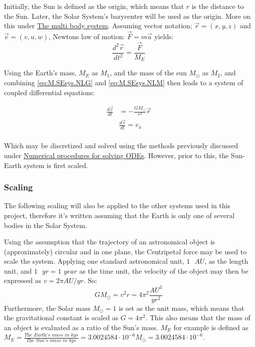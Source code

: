 \documentclass[%
oneside,                 %
final,                   %
10pt]{article}
\begin{document}
Initially, the Sun is defined as the origin, which means that $r$ is the distance to the Sun. Later, the Solar System's barycenter will be used as the origin. More on this under \hyperref[sec:Modmultibody]{The multi body system}. Assuming vector notation; $\vec{r}=(x,y,z)$ and $\vec{v}=(v,u,w)$,  Newtons law of motion: $\vec{F}=m\vec{a}$ yields: \newline
\begin{equation}
\frac{d^2 \vec{r}}{dt^2}=\frac{\vec{F}}{M_E}
\label{eq:M.SEsys.NLM}
\end{equation}

Using the Earth's mass, $M_E$ as $M_1$, and the mass of the sun $M_{\odot}$ as $M_2$, and combining \eqref{eq:M.SEsys.NLG} and \eqref{eq:M.SEsys.NLM} then leads to a system of coupled differential equations:


\begin{align}
\frac{d\vec{v} }{dt}&=-\frac{GM_{\odot}}{r^3} \vec{r} \label{eq:M.SEsys.dv/dt} \\
&\frac{d\vec{r}}{dt}=v_x \label{eq:M.SEsys.dr/dt}\\
\end{align}

Which may be discretized and solved using the methods previously discussed under \hyperref[sec:NPs]{Numerical procedures for solving ODEs}. However, prior to this, the Sun-Earth system is first scaled. 

\subsubsection{Scaling}
The following scaling will also be applied to the other systems used in this project, therefore it's written assuming that the Earth is only one of several bodies in the Solar System.\newline

Using the assumption that the trajectory of an astronomical object is (approximately) circular and in one plane, the Centripetal force may be used to scale the system. Applying one standard astronomical unit, $1 \text{ } AU$, as the length unit, and $1 \text{ } yr=1 \textit{ year}$ as the time unit, the velocity of the object may then be expressed as $v=2\pi AU/yr$. So:
\begin{equation}
GM_{\odot}=v^2r=4\pi^2  \frac{AU^3}{yr^2} 
\end{equation}
Furthermore, the Solar mass $M_{\odot}=1$ is set as the unit mass, which means that the gravitational constant is scaled as $G=4\pi^2$. This also means that the mass of an object is evaluated as a ratio of the Sun's mass. $M_E$ for example is defined as $M_E=\frac{\textit{The Earth's mass in kgs}}{\textit{The Sun's mass in kgs}}=3.0024584 \cdot  10^{-6} M_{\odot}=3.0024584 \cdot  10^{-6}$. 
\end{document}
